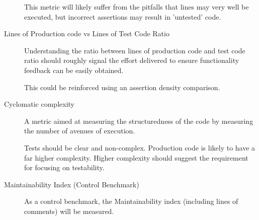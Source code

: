 \begin{description}
	This metric will likely suffer from the pitfalls that lines may very well be executed, but incorrect assertions may result in 'untested' code.
		
	\item [Lines of Production code vs Lines of Test Code Ratio] 
	
	Understanding the ratio between lines of production code and test code ratio should roughly signal the effort delivered to ensure functionality feedback can be easily obtained.
	
	This could be reinforced using an assertion density comparison.
	
	
	\item [Cyclomatic complexity] 
	
	A metric aimed at measuring the structuredness of the code by measuring the number of avenues of execution. 
	
	Tests should be clear and non-complex. Production code is likely to have a far higher complexity. Higher complexity should suggest the requirement for focusing on testability.
	
	
	\item [Maintainability Index (Control Benchmark)] As a control benchmark, the Maintainability index (including lines of comments) will be measured.
\end{description}